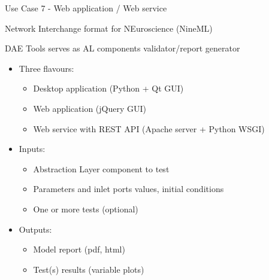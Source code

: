 \documentclass[compress,newPxFont,sthlmFooter]{beamer}
\begin{document}
\begin{frame}[plain]{Use Case 7 - Web application / Web service}
    \begin{center}
        \alert{Network Interchange format for NEuroscience (NineML)}
    \end{center}   
    \small{DAE Tools serves as \alert{AL components validator/report generator}}
    
    \begin{itemize}
        \item Three flavours:
        \begin{itemize}
            \item \alert{Desktop application} (Python + Qt GUI)
            \item \alert{Web application} (jQuery GUI)
            \item \alert{Web service} with REST API (Apache server + Python WSGI)
        \end{itemize}
        \item Inputs:
            \begin{itemize}
                \item Abstraction Layer component to test
                \item Parameters and inlet ports values, initial conditions
                \item One or more tests (optional)
            \end{itemize}
        \item Outputs:
            \begin{itemize}
                \item Model report (pdf, html)
                \item Test(s) results (variable plots)
            \end{itemize}
    \end{itemize}
\end{frame}
\end{document}
